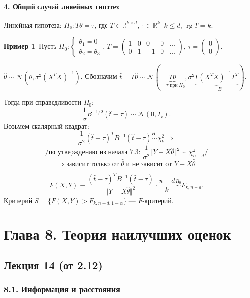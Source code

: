 \documentclass[12pt]{report}
\DeclareMathOperator{\rg}{rg}
\theoremstyle{definition}
\newtheorem{example}{Пример}
\begin{document}
\subsubsection{4. Общий случай линейных гипотез}
Линейная гипотеза: $H_0: T\theta = \tau$, где $T \in \mathbb{R}^{k\times d}$, $\tau \in \mathbb{R}^k$, $k \leqslant d$, $\rg T = k$.
\begin{example}
	Пусть $
	H_0: 
	\begin{cases}
		\theta_1 = 0 \\
		\theta_2 = \theta_3
	\end{cases}
	$, $T = \begin{pmatrix}
		1 & 0 & 0 & 0 & \ldots \\
		0 & 1 & -1 & 0 & \ldots 
	\end{pmatrix}$, $\tau = \begin{pmatrix}
		0 \\
		0
	\end{pmatrix}$.

	$\hat{\theta} \sim \mathcal{N}(\theta, \sigma^2(X^T X)^{-1})$. Обозначим $\hat{t} = T\hat{\theta} \sim \mathcal{N}(\underbrace{T\theta}_{=\tau \text{ при } H_0}, \sigma^2\underbrace{T(X^T X)^{-1} T^T}_{=B})$.

	Тогда при справедливости $H_0$:
	$$\dfrac{1}{\sigma}B^{-1/2}(\hat{t} - \tau) \sim \mathcal{N}(0, I_k).$$
	Возьмем скалярный квадрат:
	$$\dfrac{1}{\sigma^2}(\hat{t} - \tau)^T B^{-1}(\hat{t} - \tau) \stackrel{H_0}{\sim} \chi^2_k \Rightarrow$$
	$$/ \text{по утверждению из начала 7.3: } \dfrac{1}{\sigma^2}\Vert Y - X\hat{\theta}\Vert^2 \sim \chi^2_{n-d}/$$
	$$\Rightarrow \text{зависит только от }\hat{\theta} \text{ и не зависит от }Y - X\hat{\theta}.$$

	$$F(X, Y) = \dfrac{(\hat{t} - \tau)^TB^{-1}(\hat{t} - \tau)}{\Vert Y - X\hat{\theta} \Vert^2} \cdot \dfrac{n-d}{k} \stackrel{H_0}{\sim} F_{k, n-d}.$$
	Критерий $S = \{F(X, Y) > F_{k, n-d, 1-\alpha}\}$ — $F$-критерий.
\end{example}

\chapter{Глава 8. Теория наилучших оценок}
\section{Лекция 14 (от 2.12)}
\subsection{8.1. Информация и расстояния}
\end{document}
